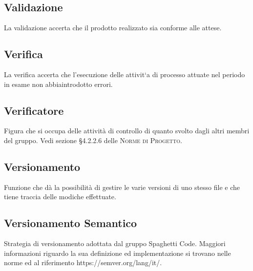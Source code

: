\documentclass[../glossario.tex]{subfiles}
\begin{document}
\subsection*{Validazione}
{}
La validazione accerta che il prodotto realizzato sia conforme alle attese.

\subsection*{Verifica}
{}
La verifica accerta che l’esecuzione delle attivit`a di processo attuate nel periodo in esame non abbiaintrodotto errori.

\subsection*{Verificatore}
{}
Figura che si occupa delle attività di controllo di quanto svolto dagli altri membri del gruppo. Vedi sezione \S4.2.2.6 delle \textsc{Norme di Progetto}.

\subsection*{Versionamento}
{}
Funzione che dà la possibilità di gestire le varie versioni di uno stesso file e che tiene traccia delle modiche effettuate.

\subsection*{Versionamento Semantico}
{}
Strategia di versionamento adottata dal gruppo Spaghetti Code. Maggiori informazioni riguardo la sua definizione ed implementazione si trovano nelle norme ed al riferimento https://semver.org/lang/it/.
\end{document}

